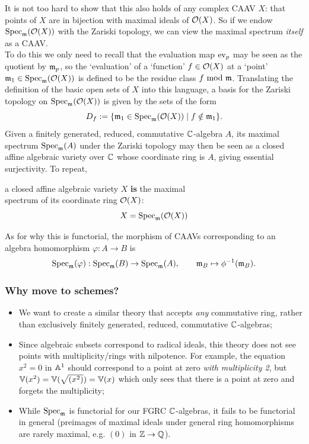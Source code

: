 It is not too hard to show that this also holds of any complex CAAV $X$: that points of $X$ are in bijection with maximal ideals of $\mathcal{O}(X)$. So if we endow $\mathrm{Spec}_{\mathfrak{m}}(\mathcal{O}(X))$ with the Zariski topology, we can view the maximal spectrum \emph{itself} as a CAAV.\\ 

To do this we only need to recall that the evaluation map $\mathrm{ev}_p$ may be seen as the quotient by $\mathfrak{m}_p$, so the `evaluation' of a `function' $f \in \mathcal{O}(X)$ at a `point' $\mathfrak{m}_1 \in \mathrm{Spec}_{\mathfrak{m}}(\mathcal{O}(X))$ is defined to be the residue class $f \,\,\mathrm{mod}\,\, \mathfrak{m}$. Translating the definition of the basic open sets of $X$ into this language, a basis for the Zariski topology on $\mathrm{Spec}_{\mathfrak{m}} (\mathcal{O}(X))$ is given by the sets of the form 
\[
	D_f := \{ \mathfrak{m}_1 \in \mathrm{Spec}_{\mathfrak{m}}(\mathcal{O}(X)) \mid f \notin \mathfrak{m}_1 \}.
\]
Given a finitely generated, reduced, commutative $\mathbb{C}$-algebra $A$, its maximal spectrum $\mathrm{Spec}_{\mathfrak{m}}(A)$ under the Zariski topology may then be seen as a closed affine algebraic variety over $\mathbb{C}$ whose coordinate ring is $A$, giving essential surjectivity. To repeat, 
\begin{center}
	a closed affine algebraic variety $X$ \textbf{is} the maximal\\spectrum of its coordinate ring $\mathcal{O}(X)$:
	\[
		X = \mathrm{Spec}_{\mathfrak{m}}(\mathcal{O}(X))
	\]
\end{center}
As for why this is functorial, the morphism of CAAVs corresponding to an algebra homomorphism $\varphi : A \to B$ is 
\[
	\mathrm{Spec}_{\mathfrak{m}}(\varphi) : \mathrm{Spec}_{\mathfrak{m}}(B) \to \mathrm{Spec}_{\mathfrak{m}}(A), \qquad \mathfrak{m}_B \mapsto  \phi^{-1}(\mathfrak{m}_B).
\]


\subsubsection{Why move to schemes?}
\label{subsubsec:2_1_1_why_schemes}
\begin{itemize}
	\item We want to create a similar theory that accepts \emph{any} commutative ring, rather than exclusively finitely generated, reduced, commutative $\mathbb{C}$-algebras;
	\item Since algebraic subsets correspond to radical ideals, this theory does not see points with multiplicity/rings with nilpotence. For example, the equation $x^2 =0$ in $\mathbb{A}^1$ should correspond to a point at zero \emph{with multiplicity 2}, but $\mathbb{V}(x^2) = \mathbb{V}(\sqrt{(x^2)}) = \mathbb{V}(x)$ which only sees that there is a point at zero and forgets the multiplicity;
	\item While $\mathrm{Spec}_{\mathfrak{m}}$ is functorial for our FGRC $\mathbb{C}$-algebras, it fails to be functorial in general (preimages of maximal ideals under general ring homomorphisms are rarely maximal, e.g. $(0)$ in $\mathbb{Z} \to \mathbb{Q}$). 
\end{itemize}

